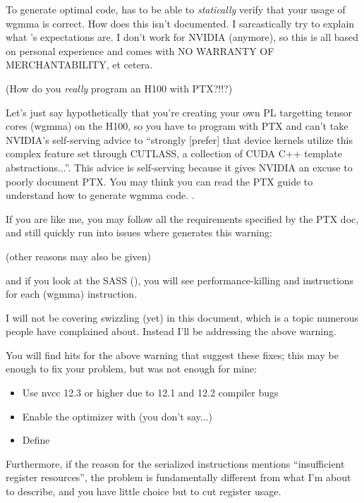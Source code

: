 





To generate optimal code,  has to be able to \textit{statically} verify that your usage of wgmma is correct.
How  does this isn't documented.
I sarcastically try to explain what 's expectations are.
I don't work for NVIDIA (anymore), so this is all based on personal experience and comes with NO WARRANTY OF MERCHANTABILITY, et cetera.


\hfill\textsf{(How do you \textit{really} program an H100 with PTX?!!?)}

Let's just say hypothetically that you're creating your own PL targetting tensor cores (wgmma) on the H100, so you have to program with PTX and can't take NVIDIA's self-serving advice to ``strongly [prefer] that device kernels utilize this complex feature set through CUTLASS, a collection of CUDA C++ template abstractions...''.
This advice is self-serving because it gives NVIDIA an excuse to poorly document PTX.
You may think you can read the PTX guide to understand how to generate wgmma code.
.

If you are like me, you may follow all the requirements specified by the PTX doc, and still quickly run into issues where  generates this warning:

\filbreak
{}

(other reasons may also be given)

and if you look at the SASS (), you will see performance-killing  and  instructions for each  (wgmma) instruction.

\filbreak
I will not be covering swizzling (yet) in this document, which is a topic numerous people have complained about.
Instead I'll be addressing the above warning.

\filbreak
{}

You will find hits for the above warning that suggest these fixes; this may be enough to fix your problem, but was not enough for mine:
\begin{itemize}
  \item Use nvcc 12.3 or higher due to 12.1 and 12.2 compiler bugs
  \item Enable the optimizer with  (you don't say...)
  \item Define 
\end{itemize}
Furthermore, if the reason for the serialized instructions mentions ``insufficient register resources'', the problem is fundamentally different from what I'm about to describe, and you have little choice but to cut register usage.

